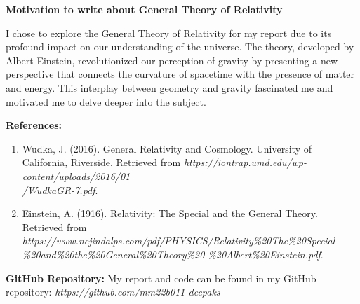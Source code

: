 \documentclass{article}
\begin{document}
\textbf{Motivation to write about General Theory of Relativity}

I chose to explore the General Theory of Relativity for my report due to its profound impact on our understanding of the universe. The theory, developed by Albert Einstein, revolutionized our perception of gravity by presenting a new perspective that connects the curvature of spacetime with the presence of matter and energy. This interplay between geometry and gravity fascinated me and motivated me to delve deeper into the subject.

\vspace{0.5cm}
\textbf{References:}
\begin{enumerate}
  \item Wudka, J. (2016). General Relativity and Cosmology. University of California, Riverside. Retrieved from \textit{https://iontrap.umd.edu/wp-content/uploads/2016/01\\/WudkaGR-7.pdf}.
  \item Einstein, A. (1916). Relativity: The Special and the General Theory. Retrieved from \textit{https://www.ncjindalps.com/pdf/PHYSICS/Relativity\%20The\%20Special\\\%20and\%20the\%20General\%20Theory\%20-\%20Albert\%20Einstein.pdf}.
\end{enumerate}

\vspace{1cm}

\textbf{GitHub Repository:} My report and code can be found in my GitHub repository: \textit{https://github.com/mm22b011-deepaks}
\end{document}
